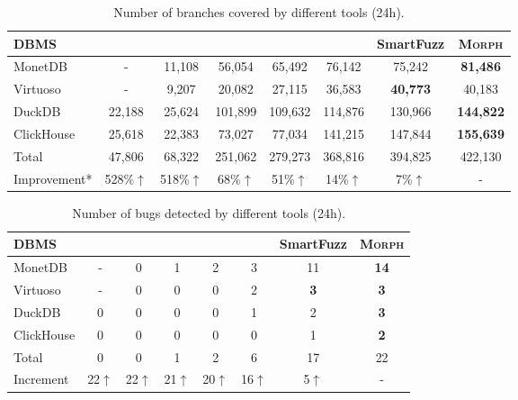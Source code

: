 \documentclass[conference]{IEEEtran}
\begin{document}
\begin{table}[!h]
\centering
\caption{Number of branches covered by different tools (24h).}
\label{tab:coverage}
{\scriptsize
\setlength{\tabcolsep}{1pt}
\begin{tabular*}{\columnwidth}{@{\extracolsep{\fill}}lccccccc@{}}
    \toprule
    \textbf{DBMS} & \sqlancer{} & \sqlright{} & \squirrel{} & \griffin{} & \sedar{} & SmartFuzz & \textsc{Morph} \\
    \midrule
    MonetDB    & - & 11,108 & 56,054 & 65,492 & 76,142 & 75,242 & \textbf{81,486} \\
    Virtuoso   & - & 9,207 & 20,082 & 27,115 & 36,583 & \textbf{40,773} & 40,183 \\
    DuckDB     & 22,188 & 25,624 & 101,899 & 109,632 & 114,876 & 130,966 & \textbf{144,822} \\
    ClickHouse & 25,618 & 22,383 & 73,027 & 77,034 & 141,215 & 147,844 & \textbf{155,639} \\
    \midrule
    Total      & 47,806 & 68,322 & 251,062 & 279,273 & 368,816 & 394,825 & 422,130 \\
    Improvement* & 528\%$\uparrow$ & 518\%$\uparrow$ & 68\%$\uparrow$ & 51\%$\uparrow$ & 14\%$\uparrow$ & 7\%$\uparrow$ & - \\
    \bottomrule
\end{tabular*}

\par\vspace{1pt}
\noindent{}
}


\end{table}

\begin{table}[t]
\centering
\caption{Number of bugs detected by different tools (24h).}
\label{tab:bugs}
{\scriptsize
\setlength{\tabcolsep}{1pt}
\begin{tabular*}{\columnwidth}{@{\extracolsep{\fill}}lccccccc@{}}
    \toprule
    \textbf{DBMS} & \sqlancer{} & \sqlright{} & \squirrel{} & \griffin{} & \sedar{} & SmartFuzz & \textsc{Morph} \\
    \midrule
    MonetDB    & - & 0 & 1 & 2 & 3 & 11 & \textbf{14} \\
    Virtuoso   & - & 0 & 0 & 0 & 2 & \textbf{3} & \textbf{3} \\
    DuckDB     & 0 & 0 & 0 & 0 & 1 & 2 & \textbf{3} \\
    ClickHouse & 0 & 0 & 0 & 0 & 0 & 1 & \textbf{2} \\
    \midrule
    Total      & 0 & 0 & 1 & 2 & 6 & 17 & 22 \\
    Increment  & 22$\uparrow$ & 22$\uparrow$ & 21$\uparrow$ & 20$\uparrow$ & 16$\uparrow$ & 5$\uparrow$ & - \\
    \bottomrule
\end{tabular*}
}
\end{table}
\end{document}
